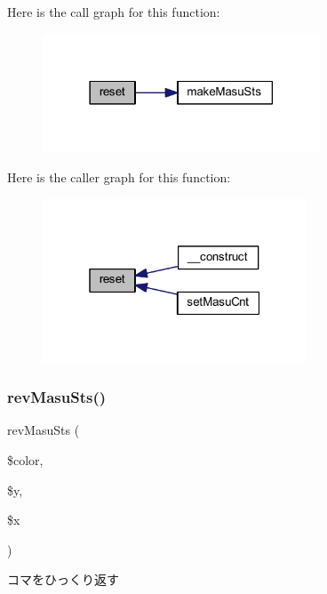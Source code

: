 Here is the call graph for this function\+:\nopagebreak
\begin{figure}[H]
\begin{center}
\leavevmode
\includegraphics[width=234pt]{class_reversi_a4a20559544fdf4dcb457e258dc976cf8_cgraph}
\end{center}
\end{figure}
Here is the caller graph for this function\+:\nopagebreak
\begin{figure}[H]
\begin{center}
\leavevmode
\includegraphics[width=223pt]{class_reversi_a4a20559544fdf4dcb457e258dc976cf8_icgraph}
\end{center}
\end{figure}
\mbox{\label{class_reversi_af29cd3f41dc1cffead056dbbed55ae7a}} 
\subsubsection{\texorpdfstring{rev\+Masu\+Sts()}{revMasuSts()}}
{\footnotesize\ttfamily rev\+Masu\+Sts (\begin{DoxyParamCaption}\item[{}]{\$color,  }\item[{}]{\$y,  }\item[{}]{\$x }\end{DoxyParamCaption})\hspace{0.3cm}{\ttfamily [private]}}



コマをひっくり返す 


